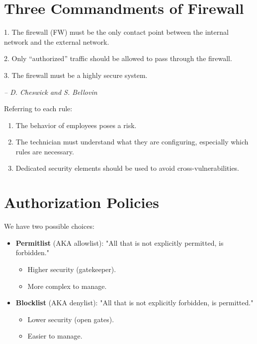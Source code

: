 \section{Three Commandments of Firewall}
\begin{center}
    1. The firewall (FW) must be the only contact point between the internal network and the external network.
\end{center}

\begin{center}
    2. Only “authorized” traffic should be allowed to pass through the firewall.
\end{center}

\begin{center}
    3. The firewall must be a highly secure system.
\end{center}

\emph{-- D. Cheswick and S. Bellovin}

\noindent Referring to each rule:
\begin{enumerate}
    \item The behavior of employees poses a risk.
    \item The technician must understand what they are configuring, especially which rules are necessary.
    \item Dedicated security elements should be used to avoid cross-vulnerabilities.
\end{enumerate}

\section{Authorization Policies}
We have two possible choices:
\begin{itemize}
    \item \textbf{Permitlist} (AKA allowlist): "All that is not explicitly permitted, is forbidden."
    \begin{itemize}
        \item Higher security (gatekeeper).
        \item More complex to manage.
    \end{itemize}
    \item \textbf{Blocklist} (AKA denylist): "All that is not explicitly forbidden, is permitted."
    \begin{itemize}
        \item Lower security (open gates).
        \item Easier to manage.
    \end{itemize}
\end{itemize}


